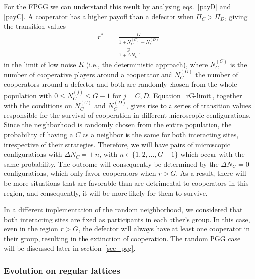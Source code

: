 \documentclass[5p,review]{elsarticle}
\begin{document}
For the FPGG we can understand this result by analysing  eqs.~\ref{payD} and \ref{payC}. A cooperator has a higher payoff than a defector when $\Pi_C > \Pi_D$, giving the transition values
\begin{equation}
\begin{split}
   r^* &= \frac{G}{1 + N^{{\scriptscriptstyle(C)}}_C-N^{{\scriptscriptstyle(D)}}_C} \\
   &= \frac{G}{1+\Delta N_C}.
   \end{split}
   \label{rG-limit}
\end{equation}
%
in the limit of low noise $K$ (i.e., the deterministic approach), where $N^{{\scriptscriptstyle(C)}}_C$ is the number of cooperative players around a cooperator and $N^{{\scriptscriptstyle(D)}}_C$ the number of cooperators around a defector and both are randomly chosen from the whole population with  $0\leqslant N^{{\scriptscriptstyle(j)}}_C\leqslant G-1$ for $j = C,D$. 
%
Equation~\ref{rG-limit}, together with the conditions on $N^{{\scriptscriptstyle(C)}}_C$ and $N^{{\scriptscriptstyle(D)}}_C$, gives rise to a series of transition values responsible for the survival of cooperation in different microscopic configurations.  
%
Since the neighborhood is randomly chosen from the entire population, the probability of having a $C$ as a neighbor is the same for both interacting sites, irrespective of their strategies.
%
Therefore, we will have pairs of microscopic configurations with $\Delta N_C =\pm \,n$, with $n \in \{1, 2,\dots , G - 1\}$ which occur with the same probability. The outcome will consequently be determined by the $\Delta N_C = 0$ configurations, which only favor cooperators when $r > G$.
%
As a result, there will be more situations that are favorable than are detrimental to cooperators in this region, and consequently, it will be more likely for them to survive. 

In a different implementation of the random neighborhood, we considered that both interacting sites are fixed as participants in each other's group. In this case, even in the region $r>G$, the defector will always have at least one cooperator in their group, resulting in the extinction of cooperation.
%
The random PGG case will be discussed later in section~\ref{sec_pgg}.
%
\subsubsection*{Evolution on regular lattices} 
\end{document}
